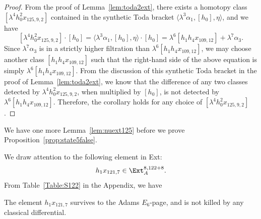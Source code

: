 \documentclass{amsart}
\numberwithin{equation}{section}
\begin{document}
\begin{proof}
    From the proof of Lemma~\ref{lem:toda2ext}, there exists a homotopy class $[\lambda^4 h_0^2x_{125,9,2}]$ contained in the synthetic Toda bracket $ \langle \lambda^3 \alpha_1, [h_0], \eta \rangle$, and we have
    $$[\lambda^4 h_0^2x_{125,9,2}] \cdot [h_0] = \langle \lambda^3 \alpha_1, [h_0], \eta \rangle \cdot [h_0] = \lambda^6 [h_1h_4x_{109,12}] + \lambda^7 \alpha_3.$$
    Since $\lambda^7 \alpha_3$ is in a strictly higher filtration than $\lambda^6 [h_1h_4x_{109,12}]$, we may choose another class $[h_1h_4x_{109,12}]$ such that the right-hand side of the above equation is simply $\lambda^6 [h_1h_4x_{109,12}]$. From the discussion of this synthetic Toda bracket in the proof of Lemma~\ref{lem:toda2ext}, we know that the difference of any two classes detected by $\lambda^4 h_0^2x_{125,9,2}$, when multiplied by $[h_0]$, is not detected by $\lambda^6 [h_1h_4x_{109,12}]$. Therefore, the corollary holds for any choice of $[\lambda^4 h_0^2x_{125,9,2}]$.
\end{proof}
















We have one more Lemma~\ref{lem:nuext125} before we prove Proposition~\ref{prop:state5false}.

We draw attention to the following element in Ext:
$$h_1x_{121,7} \in \Ext_A^{8,122+8}.$$
From Table~\ref{Table:S122} in the Appendix, we have
\begin{fact} \label{fact:h_1_mul_x_121_7}\label{fact:h1x1217}
    The element $h_1x_{121,7}$ survives to the Adams $E_6$-page, and is not killed by any classical differential.
\end{fact}
\end{document}
